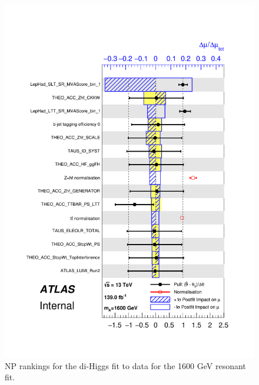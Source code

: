 \begin{figure}
\centering
\includegraphics[width=.8\textwidth]{figures/results/HH/LepHad/pulls_SigXsecOverSM_1600.pdf}
\caption{NP rankings for the di-Higgs \lephad fit to data for the 1600 GeV resonant fit.}
\label{fig:LepHadPostfitNPRankings2HDM1600}
\end{figure}

